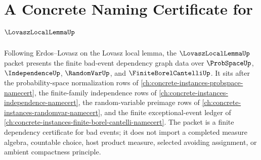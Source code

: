 \chapter{A Concrete Naming Certificate for $\LovaszLocalLemmaUp$}
\label{ch:concrete-instances-lovasz-local-lemma-namecert}

Following Erdos--Lovasz on the Lovasz local lemma, the $\LovaszLocalLemmaUp$ packet presents the finite bad-event dependency graph data over $\ProbSpaceUp$, $\IndependenceUp$, $\RandomVarUp$, and $\FiniteBorelCantelliUp$. It sits after the probability-space normalization rows of \autoref{ch:concrete-instances-probspace-namecert}, the finite-family independence rows of \autoref{ch:concrete-instances-independence-namecert}, the random-variable preimage rows of \autoref{ch:concrete-instances-randomvar-namecert}, and the finite exceptional-event ledger of \autoref{ch:concrete-instances-finite-borel-cantelli-namecert}. The packet is a finite dependency certificate for bad events; it does not import a completed measure algebra, countable choice, host product measure, selected avoiding assignment, or ambient compactness principle.

